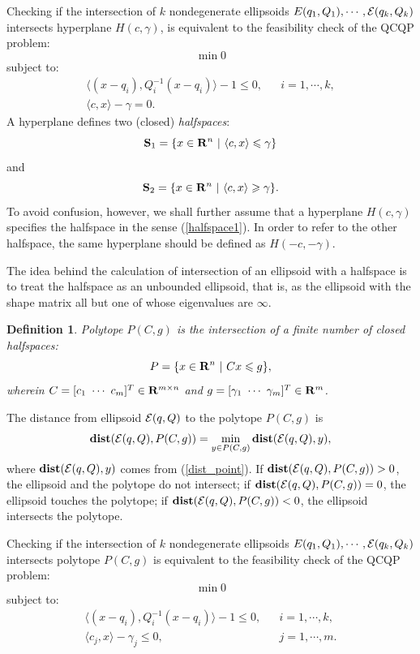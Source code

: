 \documentclass{report}
\newtheorem{df}{Definition}[section]
\newcommand{\bd}{\begin{df}}
\newcommand{\ed}{\end{df}}
\newcommand{\EE}{{\cal E}}
\begin{document}
Checking if the intersection of $k$ nondegenerate ellipsoids
$E(q_1,Q_1),\cdots,\EE(q_k,Q_k)$ intersects  hyperplane $H(c,\gamma)$,
is equivalent to the feasibility check of the QCQP problem:
\[ \min 0 \]
subject to:
\begin{eqnarray*}
\langle (x-q_i),Q_i^{-1}(x-q_i)\rangle - 1 \leq 0, & & i=1,\cdots,k,\\
\langle c, x\rangle - \gamma = 0. & &
\end{eqnarray*}
A hyperplane defines two (closed) {\it halfspaces}:
\begin{equation}
{\bf S}_1 = \{x\in{\bf R}^n ~|~ \langle c, x\rangle \leq \gamma\}
\label{halfspace1}
\end{equation}
and
\begin{equation}
{\bf S}_2 = \{x\in{\bf R}^n ~|~ \langle c, x\rangle \geq \gamma\}.
\label{halfspace2}
\end{equation}
To avoid confusion, however, we shall further assume that a
 hyperplane $H(c,\gamma)$ specifies the halfspace in the sense
(\ref{halfspace1}). In order to refer to the
other halfspace, the same hyperplane should be defined as $H(-c,-\gamma)$.

The idea behind the calculation of intersection of an ellipsoid with a
halfspace is to treat the halfspace as an unbounded ellipsoid, that is, as the
ellipsoid with the shape matrix  all but one of whose eigenvalues are $\infty$.
\bd
Polytope $P(C,g)$ is the  intersection of a finite number
of closed halfspaces:
\[ P = \{x\in{\bf R}^n ~|~ Cx\leq g\}, \]
wherein $C=[c_1 ~ \cdots ~ c_m]^T\in{\bf R}^{m\times n}$ and
$g=[\gamma_1 ~ \cdots ~ \gamma_m]^T\in{\bf R}^m$.
\ed
The distance from ellipsoid $\EE(q,Q)$ to the polytope $P(C,g)$ is
\begin{equation}
{\bf dist}(\EE(q,Q),P(C,g))=\min_{y\in P(C,g)}{\bf dist}(\EE(q,Q),y),
\label{dist_poly}
\end{equation}
where ${\bf dist}(\EE(q,Q),y)$ comes from (\ref{dist_point}).
If ${\bf dist}(\EE(q,Q),P(C,g))>0$, the ellipsoid and the polytope
do not intersect;
if ${\bf dist}(\EE(q,Q),P(C,g))=0$, the ellipsoid touches the polytope;
if ${\bf dist}(\EE(q,Q),P(C,g))<0$, the ellipsoid intersects the
polytope.

Checking if the intersection of $k$ nondegenerate ellipsoids
$E(q_1,Q_1),\cdots,\EE(q_k,Q_k)$ intersects  polytope $P(C,g)$
is equivalent to the feasibility check of the QCQP problem:
\[ \min 0 \]
subject to:
\begin{eqnarray*}
\langle (x-q_i),Q_i^{-1}(x-q_i)\rangle - 1 \leq 0, & & i=1,\cdots,k,\\
\langle c_j, x\rangle - \gamma_j \leq 0, & & j=1,\cdots,m.
\end{eqnarray*}
\end{document}

